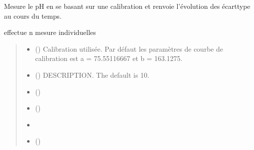 \documentclass[letterpaper,10pt,french]{sphinxmanual}
\begin{document}
\begin{fulllineitems}
\label{\detokenize{library:lib_pH.measure}}
\pysigstartsignatures
\pysiglinewithargsret
{}
{\sphinxparamcomma {}\sphinxparamcomma {}\sphinxparamcomma {}}
{}
\pysigstopsignatures
\sphinxAtStartPar
Mesure le pH en se basant sur une calibration et renvoie l’évolution des écart\sphinxhyphen{}type au cours du temps.

\sphinxAtStartPar
effectue n mesure individuelles
\begin{quote}\begin{description}
\begin{itemize}
\item {} 
\sphinxAtStartPar
{} (\sphinxstyleliteralemphasis{\sphinxupquote{, }}) \textendash{} Calibration utilisée. Par défaut les paramètres de courbe de calibration est a = 75.55116667 et b = \sphinxhyphen{}163.1275.

\item {} 
\sphinxAtStartPar
{} (\sphinxstyleliteralemphasis{\sphinxupquote{, }}) \textendash{} DESCRIPTION. The default is 10.

\item {} 
\sphinxAtStartPar
{} (\sphinxstyleliteralemphasis{\sphinxupquote{, }})

\item {} 
\sphinxAtStartPar
{} ()

\item {} 
\sphinxAtStartPar
{}

\item {} 
\sphinxAtStartPar
{} ()

\end{itemize}

\end{description}\end{quote}

\end{fulllineitems}
\end{document}
